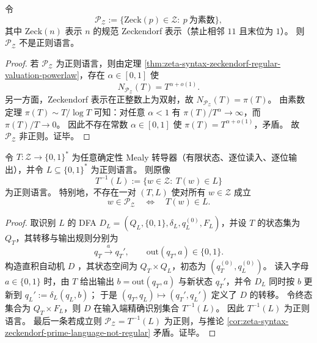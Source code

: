 \begin{corollary}\label{cor:zeta-syntax-zeckendorf-prime-language-not-regular}
令
\[
\mathcal P_{\mathcal Z}:=\{\mathrm{Zeck}(p)\in\mathcal Z:\ p\ \text{为素数}\},
\]
其中 \(\mathrm{Zeck}(n)\) 表示 \(n\) 的规范 Zeckendorf 表示（禁止相邻 \(11\) 且末位为 \(1\)）。
则 \(\mathcal P_{\mathcal Z}\) 不是正则语言。
\end{corollary}
\begin{proof}
若 \(\mathcal P_{\mathcal Z}\) 为正则语言，则由定理 \ref{thm:zeta-syntax-zeckendorf-regular-valuation-powerlaw}，存在 \(\alpha\in[0,1]\) 使
\[
N_{\mathcal P_{\mathcal Z}}(T)=T^{\alpha+o(1)}.
\]
另一方面，Zeckendorf 表示在正整数上为双射，故 \(N_{\mathcal P_{\mathcal Z}}(T)=\pi(T)\)。
由素数定理 \(\pi(T)\sim T/\log T\) 可知：对任意 \(\alpha<1\) 有 \(\pi(T)/T^\alpha\to\infty\)，而 \(\pi(T)/T\to 0\)。
因此不存在常数 \(\alpha\in[0,1]\) 使 \(\pi(T)=T^{\alpha+o(1)}\)，矛盾。
故 \(\mathcal P_{\mathcal Z}\) 非正则。证毕。
\end{proof}

\begin{corollary}\label{cor:zeta-syntax-zeckendorf-primes-mealy-regular-impossible}
令 \(T:\mathcal Z\to\{0,1\}^\ast\) 为任意确定性 Mealy 转导器（有限状态、逐位读入、逐位输出），并令 \(L\subseteq\{0,1\}^\ast\) 为正则语言。
则原像
\[
T^{-1}(L):=\{w\in\mathcal Z:\ T(w)\in L\}
\]
为正则语言。
特别地，不存在一对 \((T,L)\) 使对所有 \(w\in\mathcal Z\) 成立
\[
w\in\mathcal P_{\mathcal Z}\quad\Longleftrightarrow\quad T(w)\in L.
\]
\end{corollary}
\begin{proof}
取识别 \(L\) 的 DFA \(D_L=(Q_L,\{0,1\},\delta_L,q_L^{(0)},F_L)\)，并设 \(T\) 的状态集为 \(Q_T\)，其转移与输出规则分别为
\[
q_T\xrightarrow{a}q_T',\qquad \mathrm{out}(q_T,a)\in\{0,1\}.
\]
构造直积自动机 \(D\) ，其状态空间为 \(Q_T\times Q_L\)，初态为 \((q_T^{(0)},q_L^{(0)})\)。
读入字母 \(a\in\{0,1\}\) 时，由 \(T\) 给出输出 \(b=\mathrm{out}(q_T,a)\) 与新状态 \(q_T'\)，并令 \(D_L\) 同时按 \(b\) 更新到 \(q_L':=\delta_L(q_L,b)\)；
于是 \((q_T,q_L)\mapsto(q_T',q_L')\) 定义了 \(D\) 的转移。
令终态集合为 \(Q_T\times F_L\)，则 \(D\) 在输入端精确识别集合 \(T^{-1}(L)\)。
因此 \(T^{-1}(L)\) 为正则语言。
最后一条若成立则 \(\mathcal P_{\mathcal Z}=T^{-1}(L)\) 为正则，与推论 \ref{cor:zeta-syntax-zeckendorf-prime-language-not-regular} 矛盾。证毕。
\end{proof}

